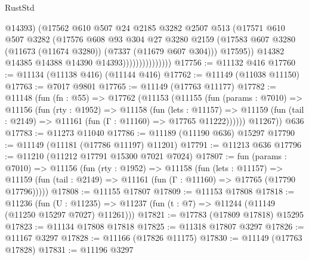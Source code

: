 \begin{lexlean}{RustStd}
\begin{coremodule}
                                  @14393)
                                (@17562
                                  @610
                                  @507
                                  @24
                                  @2185
                                  @3282
                                  @2507
                                  @513
                                  (@17571
                                    @610
                                    @507
                                    @3282
                                    (@17576
                                      @608
                                      @93
                                      @304
                                      @27
                                      @3280
                                      @2159
                                      (@17583
                                        @607
                                        @3280
                                        (@11673 (@11674 @3280))
                                        (@7337 (@11679 @607 @304)))
                                      @17595))
                                  @14382
                                  @14385
                                  @14388
                                  @14390
                                  @14393)))))))))))))))
@17756 := @11132 @416
@17760 := @11134 (@11138 @416) (@11144 @416)
@17762 := @11149 (@11038 @11150)
@17763 := @7017 @9801
@17765 := @11149 (@17763 @11177)
@17782 := @11148
    (fun (fn : @55) =>
    @17762
      (@11153
        (@11155
          (fun (params : @7010) =>
          @11156
            (fun (rty : @1952) =>
            @11158
              (fun (lets : @11157) =>
              @11159 (fun (tail : @2149) => @11161 (fun (Γ : @11160) => @17765 @11222))))))
        @11267))
    @636
@17783 := @11273 @11040
@17786 := @11189 (@11190 @636) @15297
@17790 := @11149 (@11181 (@17786 @11197) @11201)
@17791 := @11213 @636
@17796 := @11210 (@11212 @17791 @15300 @7021 @7024)
@17807 := fun (params : @7010) =>
  @11156
    (fun (rty : @1952) =>
    @11158
      (fun (lets : @11157) =>
      @11159 (fun (tail : @2149) => @11161 (fun (Γ : @11160) => @17765 (@17790 @17796)))))
@17808 := @11155 @17807
@17809 := @11153 @17808
@17818 := @11236
    (fun (U : @11235) => @11237 (fun (t : @7) => @11244 (@11149 (@11250 @15297 @7027) @11261)))
@17821 := @17783 (@17809 @17818) @15295
@17823 := @11134 @17808 @17818
@17825 := @11318 @17807 @3297
@17826 := @11167 @3297
@17828 := @11166 (@17826 @11175)
@17830 := @11149 (@17763 @17828)
@17831 := @11196 @3297

\end{coremodule}
\end{lexlean}
